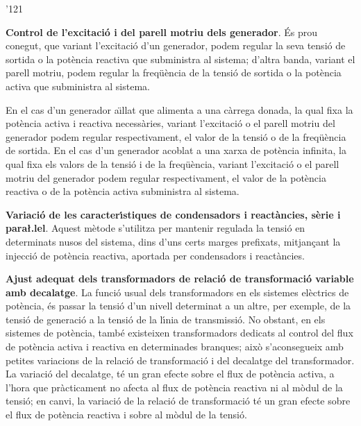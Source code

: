 \begin{dinglist}{'121}
   \item \textbf{Control de l'excitaci\'{o} i del parell motriu dels generador}. \'{E}s prou conegut,
    que variant l'excitaci\'{o} d'un generador, podem regular la seva tensi\'{o} de sortida o
        la pot\`{e}ncia reactiva que subministra al sistema; d'altra banda, variant el parell motriu,
    podem regular la freq\"{u}\`{e}ncia de la tensi\'{o} de sortida o la pot\`{e}ncia activa que subministra al sistema.

    En el cas d'un generador a\"{\i}llat que alimenta a una c\`{a}rrega
    donada, la qual fixa la pot\`{e}ncia activa i reactiva necess\`{a}ries, variant
     l'excitaci\'{o} o el parell motriu del
    generador podem regular respectivament, el valor de la tensi\'{o}
    o de la freq\"{u}\`{e}ncia de sortida. En el cas d'un generador acoblat a una xarxa de pot\`{e}ncia
    infinita, la qual fixa els valors de la tensi\'{o} i de la freq\"{u}\`{e}ncia, variant l'excitaci\'{o} o el parell motriu del
    generador podem regular respectivament, el valor de la pot\`{e}ncia reactiva o de la pot\`{e}ncia
    activa  subministra al sistema.

   \item \textbf{Variaci\'{o} de les caracter\'{\i}stiques de condensadors i react\`{a}ncies, s\`{e}rie
    i para{\l.l}el}. Aquest m\`{e}tode s'utilitza per mantenir regulada la tensi\'{o} en determinats
     nusos del sistema, dins d'uns certs marges prefixats, mitjan\c{c}ant la injecci\'{o}  de pot\`{e}ncia
      reactiva, aportada per condensadors i react\`{a}ncies.

   \item \textbf{Ajust adequat dels transformadors de relaci\'{o} de transformaci\'{o} variable amb
    decalatge}. La funci\'{o} usual dels transformadors en els sistemes el\`{e}ctrics de pot\`{e}ncia,
    \'{e}s passar la tensi\'{o} d'un nivell determinat a un altre, per exemple, de la tensi\'{o} de generaci\'{o}
    a la tensi\'{o} de la l\'{\i}nia de transmissi\'{o}. No obstant, en els sistemes de pot\`{e}ncia, tamb\'{e} existeixen
    transformadors dedicats al control del flux de pot\`{e}ncia activa i reactiva en determinades
    branques; aix\`{o} s'aconsegueix amb petites variacions de la relaci\'{o} de transformaci\'{o} i del
    decalatge del transformador. La variaci\'{o} del decalatge, t\'{e} un gran efecte sobre el flux
    de pot\`{e}ncia activa, a l'hora que pr\`{a}cticament no afecta al flux de pot\`{e}ncia reactiva ni al
    m\`{o}dul de la tensi\'{o}; en canvi, la variaci\'{o} de la relaci\'{o} de transformaci\'{o} t\'{e} un gran efecte
    sobre el flux de pot\`{e}ncia reactiva i sobre al m\`{o}dul de la tensi\'{o}.
\end{dinglist}
